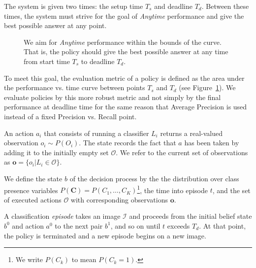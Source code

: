 \documentclass[runningheads]{llncs}
\begin{document}
The system is given two times: the setup time $T_s$ and deadline $T_d$.
Between these times, the system must strive for the goal of \emph{Anytime} performance and give the best possible answer at any point.

\begin{figure}[h!]
  \caption{We aim for \emph{Anytime} performance within the bounds of the curve. That is, the policy should give the best possible answer at any time from start time $T_s$ to deadline $T_d$.}
  \label{fig:evaluation}
\end{figure}

To meet this goal, the evaluation metric of a policy is defined as the area under the performance vs. time curve between points $T_s$ and $T_d$ (see Figure~\ref{fig:evaluation}).
We evaluate policies by this more robust metric and not simply by the final performance at deadline time for the same reason that Average Precision is used instead of a fixed Precision vs. Recall point.

An action $a_i$ that consists of running a classifier $L_i$ returns a real-valued observation $o_i \sim P(O_i)$.
The state records the fact that $a$ has been taken by adding it to the initially empty set $\mathcal{O}$.
We refer to the current set of observations as $\mathbf{o} = \{o_i | L_i \in \mathcal{O}\}$.

We define the state $b$ of the decision process by the the distribution over class presence variables $P(\mathbf{C}) = P(C_1, \dots, C_K)$\footnote{We write $P(C_k)$ to mean $P(C_k=1)$.}, the time into episode $t$, and the set of executed actions $\mathcal{O}$ with corresponding observations $\mathbf{o}$.

A classification \emph{episode} takes an image $\mathcal{I}$ and proceeds from the initial belief state $b^0$ and action $a^0$ to the next pair $b^1$, and so on until $t$ exceeds $T_d$.
At that point, the policy is terminated and a new episode begins on a new image.
\end{document}
